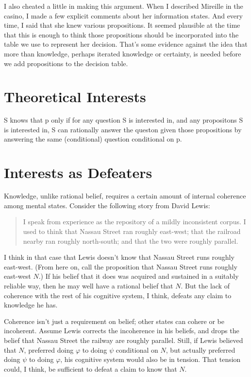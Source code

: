 \documentclass[11pt,]{book}
\begin{document}
I also cheated a little in making this argument. When I described Mireille in the casino, I made a few explicit comments about her information states. And every time, I said that she knew various propositions. It seemed plausible at the time that this is enough to think those propositions should be incorporated into the table we use to represent her decision. That's some evidence against the idea that more than knowledge, perhaps iterated knowledge or certainty, is needed before we add propositions to the decision table.

\hypertarget{theoretical-interests}{%
\section{Theoretical Interests}\label{theoretical-interests}}

S knows that p only if for any question S is interested in, and any propositons S is interested in, S can rationally answer the queston given those propositions by answering the same (conditional) question conditional on p.

\hypertarget{defeat}{%
\section{Interests as Defeaters}\label{defeat}}

Knowledge, unlike rational belief, requires a certain amount of internal coherence among mental states. Consider the following story from David Lewis:

\begin{quote}
I speak from experience as the repository of a mildly inconsistent corpus. I used to think that Nassau Street ran roughly east-west; that the railroad nearby ran roughly north-south; and that the two were roughly parallel. \citep[ 436]{Lewis1982c}
\end{quote}

I think in that case that Lewis doesn't know that Nassau Street runs roughly east-west. (From here on, call the proposition that Nassau Street runs roughly east-west \(N\).) If his belief that it does was acquired and sustained in a suitably reliable way, then he may well have a rational belief that \(N\). But the lack of coherence with the rest of his cognitive system, I think, defeats any claim to knowledge he has.

Coherence isn't just a requirement on belief; other states can cohere or be incoherent. Assume Lewis corrects the incoherence in his beliefs, and
drops the belief that Nassau Street the railway are roughly parallel. Still, if Lewis believed that \(N\), preferred doing \(\varphi\) to doing \(\psi\) conditional on \(N\), but actually preferred doing \(\psi\) to doing \(\varphi\), his cognitive system would also be in tension. That tension could, I think, be sufficient to defeat a claim to know that \(N\).
\end{document}
